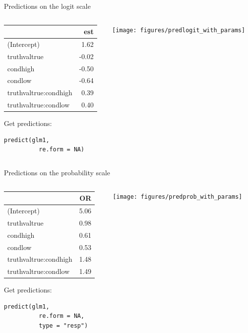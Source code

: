 \documentclass[aspectratio=169]{beamer}
\begin{document}
\begin{frame}[fragile]{Predictions on the logit scale}
  \begin{columns}
    \begin{column}[c]{.3\textwidth}
      {\small
      \begin{tabular}{@{}lr@{}}
        \hline
        & est \\
        \hline
       (Intercept)           &  1.62 \\
       truthvaltrue          & -0.02 \\
       condhigh              & -0.50 \\
       condlow               & -0.64 \\
       truthvaltrue:condhigh &  0.39 \\
       truthvaltrue:condlow  &  0.40 \\
        \hline
       \end{tabular}
       }

       \vspace{.3cm}
Get predictions:
\begin{lstlisting}[style = plain]
  predict(glm1,
          re.form = NA)
\end{lstlisting}
    \end{column}
    \begin{column}[c]{.7\textwidth}
      \texttt{[image: figures/predlogit\_with\_params]}
    \end{column}
  \end{columns}
\end{frame}

\begin{frame}[fragile]{Predictions on the probability scale}
  \begin{columns}
    \begin{column}[c]{.3\textwidth}
      {\small
      \begin{tabular}{@{}lr@{}}
      \hline
 & OR \\ 
  \hline
  (Intercept) & 5.06 \\ 
  truthvaltrue & 0.98 \\ 
  condhigh & 0.61 \\ 
  condlow & 0.53 \\ 
  truthvaltrue:condhigh & 1.48 \\ 
  truthvaltrue:condlow & 1.49 \\ 
   \hline
\end{tabular}
      }

\vspace{.3cm}
Get predictions:
\begin{lstlisting}[style = plain]
  predict(glm1, 
          re.form = NA,
          type = "resp")
\end{lstlisting}
    \end{column}
    \begin{column}[c]{.7\textwidth}
      \texttt{[image: figures/predprob\_with\_params]}
    \end{column}
  \end{columns}
\end{frame}
\end{document}
